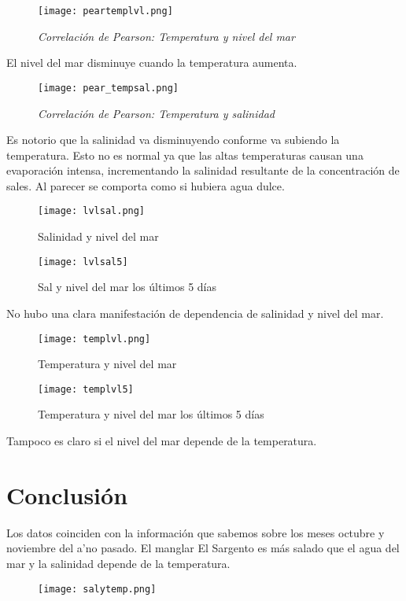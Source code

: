 \documentclass[12pt]{article}
\begin{document}
\begin{figure}[H]
\texttt{[image: peartemplvl.png]}
\centering
\caption{\emph{Correlaci\'on de Pearson: Temperatura y nivel del mar}}
\end{figure}
El nivel del mar disminuye cuando la temperatura aumenta.
\begin{figure}[H]
\texttt{[image: pear\_tempsal.png]}
\centering
\caption{\emph{Correlaci\'on de Pearson: Temperatura y salinidad}}
\end{figure}
Es notorio que la salinidad va disminuyendo conforme va subiendo la temperatura. Esto no es normal ya que las altas temperaturas causan una evaporaci\'on intensa, incrementando la salinidad resultante de la concentración de sales. Al parecer se comporta como si hubiera agua dulce.

\begin{figure}[H]
   \begin{minipage}{0.6\textwidth}
     \centering
     \texttt{[image: lvlsal.png]}
     \caption{Salinidad y nivel del mar}
   \end{minipage}\hfill
   \begin {minipage}{0.6\textwidth}
     \centering
     \texttt{[image: lvlsal5]}
     \caption{Sal y nivel del mar los \'ultimos 5 d\'ias}
   \end{minipage}
\end{figure}
No hubo una clara manifestaci\'on de dependencia de salinidad y nivel del mar.

\begin{figure}[H]
   \begin{minipage}{0.6\textwidth}
     \centering
     \texttt{[image: templvl.png]}
     \caption{Temperatura y nivel del mar}
   \end{minipage}\hfill
   \begin {minipage}{0.6\textwidth}
     \centering
     \texttt{[image: templvl5]}
     \caption{Temperatura y nivel del mar los \'ultimos 5 d\'ias}
   \end{minipage}
\end{figure}
Tampoco es claro si el nivel del mar depende de la temperatura. 


\section{Conclusi\'on}
\noindent
Los datos coinciden con la informaci\'on que sabemos sobre los meses octubre y noviembre del a'no pasado. El manglar El Sargento es m\'as salado que el agua del mar y la salinidad depende de la temperatura. 
\begin{figure}[H]
\texttt{[image: salytemp.png]}
\centering
\end{figure}
\end{document}
